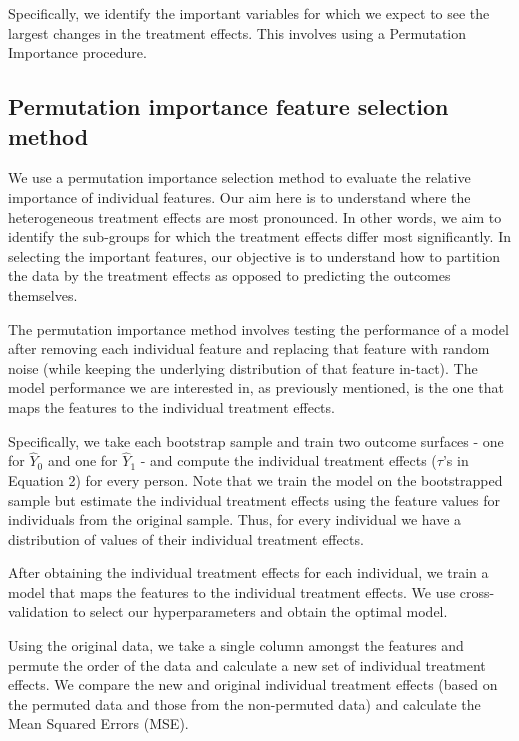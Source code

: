 \documentclass[12pt, a4paper]{article}
\begin{document}
Specifically, we identify the important variables for which we expect to see the largest changes in the treatment effects. This involves using a Permutation Importance procedure.




\subsection{Permutation importance feature selection method}

We use a permutation importance selection method to evaluate the relative importance of individual features. Our aim here is to understand where the heterogeneous treatment effects are most pronounced. In other words, we aim to identify the sub-groups for which the treatment effects differ most significantly. In selecting the important features, our objective is to understand how to partition the data by the treatment effects as opposed to predicting the outcomes themselves. 

The permutation importance method involves testing the performance of a model after removing each individual feature and replacing that feature with random noise (while keeping the underlying distribution of that feature in-tact). The model performance we are interested in, as previously mentioned, is the one that maps the features to the individual treatment effects. 

Specifically, we take each bootstrap sample and train two outcome surfaces - one for $\hat{Y}_0$ and one for $\hat{Y}_1$ - and compute the individual treatment effects ($\tau$'s in Equation 2) for every person. Note that we train the model on the bootstrapped sample but estimate the individual treatment effects using the feature values for individuals from the original sample. Thus, for every individual we have a distribution of values of their individual treatment effects. 

After obtaining the individual treatment effects for each individual, we train a model that maps the features to the individual treatment effects. We use cross-validation to select our hyperparameters and obtain the optimal model. 

Using the original data, we take a single column amongst the features and permute the order of the data and calculate a new set of individual treatment effects. We compare the new and original individual treatment effects (based on the permuted data and those from the non-permuted data) and calculate the Mean Squared Errors (MSE). 
\end{document}
